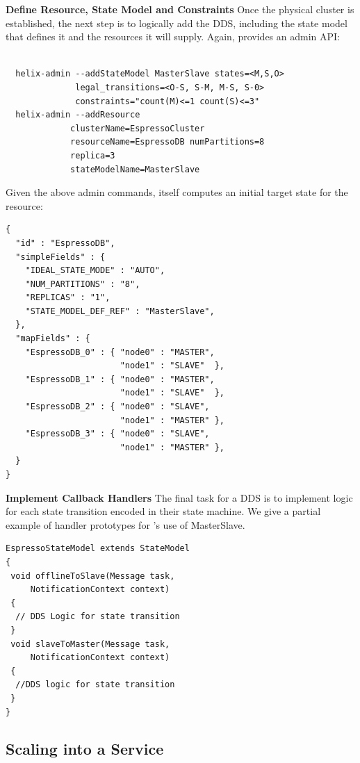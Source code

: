 \noindent \textbf{Define Resource, State Model and Constraints}
Once the physical cluster is established, the next step is to logically add the
DDS, including the state model that defines it and the resources it will supply.
Again, \helix provides an admin API: 
\small\begin{verbatim}

  helix-admin --addStateModel MasterSlave states=<M,S,O> 
              legal_transitions=<O-S, S-M, M-S, S-0> 
              constraints="count(M)<=1 count(S)<=3" 
  helix-admin --addResource 
             clusterName=EspressoCluster
		     resourceName=EspressoDB numPartitions=8 
		     replica=3
		     stateModelName=MasterSlave
\end{verbatim}
\normalsize


Given the above admin commands, \helix itself computes an initial target state
for the resource: 
\small\begin{verbatim}
{
  "id" : "EspressoDB",
  "simpleFields" : {
    "IDEAL_STATE_MODE" : "AUTO",
    "NUM_PARTITIONS" : "8",
    "REPLICAS" : "1",
    "STATE_MODEL_DEF_REF" : "MasterSlave",
  },
  "mapFields" : {
    "EspressoDB_0" : { "node0" : "MASTER",
                       "node1" : "SLAVE"  },
    "EspressoDB_1" : { "node0" : "MASTER",
                       "node1" : "SLAVE"  },
    "EspressoDB_2" : { "node0" : "SLAVE",
                       "node1" : "MASTER" },
    "EspressoDB_3" : { "node0" : "SLAVE",
                       "node1" : "MASTER" },
  }
}
\end{verbatim}
\normalsize

\noindent \textbf{Implement Callback Handlers}
The final task for a DDS is to implement logic for each state transition encoded
in their state machine.  We give a partial example of handler prototypes for
\ES's use of MasterSlave.

\small\begin{verbatim}
EspressoStateModel extends StateModel
{
 void offlineToSlave(Message task,
     NotificationContext context)
 {
  // DDS Logic for state transition
 }
 void slaveToMaster(Message task,
     NotificationContext context)
 {
  //DDS logic for state transition
 }
}
\end{verbatim}
\normalsize
\subsection{Scaling \helix into a Service}

